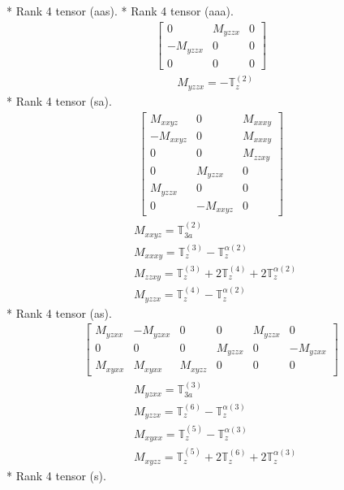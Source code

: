 \documentclass[fleqn,8pt,landscape]{jsarticle}
\begin{document}
* Rank 4 tensor (aas).
* Rank 4 tensor (aaa).
\begin{align*}
\begin{bmatrix} 0 & M_{yzzx} & 0 \\ - M_{yzzx} & 0 & 0 \\ 0 & 0 & 0 \end{bmatrix}
\end{align*}
\begin{align*}
& M_{yzzx} = - \mathbb{T}_{z}^{(2)}
\end{align*}
* Rank 4 tensor (sa).
\begin{align*}
\begin{bmatrix} M_{xxyz} & 0 & M_{xxxy} \\ - M_{xxyz} & 0 & M_{xxxy} \\ 0 & 0 & M_{zzxy} \\ 0 & M_{yzzx} & 0 \\ M_{yzzx} & 0 & 0 \\ 0 & - M_{xxyz} & 0 \end{bmatrix}
\end{align*}
\begin{align*}
& M_{xxyz} = \mathbb{T}_{3a}^{(2)} \\
& M_{xxxy} = \mathbb{T}_{z}^{(3)} - \mathbb{T}_{z}^{\alpha(2)} \\
& M_{zzxy} = \mathbb{T}_{z}^{(3)} + 2 \mathbb{T}_{z}^{(4)} + 2 \mathbb{T}_{z}^{\alpha(2)} \\
& M_{yzzx} = \mathbb{T}_{z}^{(4)} - \mathbb{T}_{z}^{\alpha(2)}
\end{align*}
* Rank 4 tensor (as).
\begin{align*}
\begin{bmatrix} M_{yzxx} & - M_{yzxx} & 0 & 0 & M_{yzzx} & 0 \\ 0 & 0 & 0 & M_{yzzx} & 0 & - M_{yzxx} \\ M_{xyxx} & M_{xyxx} & M_{xyzz} & 0 & 0 & 0 \end{bmatrix}
\end{align*}
\begin{align*}
& M_{yzxx} = \mathbb{T}_{3a}^{(3)} \\
& M_{yzzx} = \mathbb{T}_{z}^{(6)} - \mathbb{T}_{z}^{\alpha(3)} \\
& M_{xyxx} = \mathbb{T}_{z}^{(5)} - \mathbb{T}_{z}^{\alpha(3)} \\
& M_{xyzz} = \mathbb{T}_{z}^{(5)} + 2 \mathbb{T}_{z}^{(6)} + 2 \mathbb{T}_{z}^{\alpha(3)}
\end{align*}
* Rank 4 tensor (s).
\end{document}
